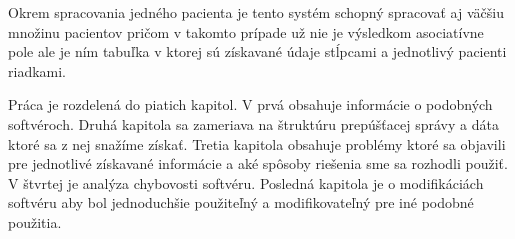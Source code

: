 Okrem spracovania jedného pacienta je tento systém schopný spracovať aj väčšiu množinu pacientov pričom v takomto prípade už nie je výsledkom asociatívne pole ale je ním tabuľka v ktorej sú získavané údaje stĺpcami a jednotlivý pacienti riadkami. 

Práca je rozdelená do piatich kapitol. V prvá obsahuje informácie o podobných softvéroch. Druhá kapitola sa zameriava na štruktúru prepúšťacej správy a dáta ktoré sa z nej snažíme získať. Tretia kapitola obsahuje problémy ktoré sa objavili pre jednotlivé získavané informácie a aké spôsoby riešenia sme sa rozhodli použiť. V štvrtej je analýza chybovosti softvéru. Posledná kapitola je o modifikáciách softvéru aby bol jednoduchšie použiteľný a modifikovateľný pre iné podobné použitia.



